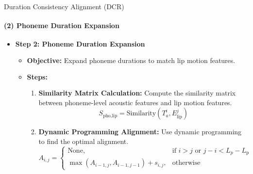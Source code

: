 \begin{frame}{Duration Consistency Alignment (DCR)}
\framesubtitle{(2) Phoneme Duration Expansion}
\begin{itemize}
    \item \textbf{Step 2: Phoneme Duration Expansion}
    \begin{itemize}
    \item \textbf{Objective:} Expand phoneme durations to match lip motion features.
    \item \textbf{Steps:}
    \begin{enumerate}
        \item \textbf{Similarity Matrix Calculation:} Compute the similarity matrix between phoneme-level acoustic features and lip motion features.
        \begin{equation}
            S_{\text{pho,lip}} = \text{Similarity}(T_a^i, E_{\text{lip}}^j)
        \end{equation}
        \item \textbf{Dynamic Programming Alignment:} Use dynamic programming to find the optimal alignment.
        \begin{equation}
            A_{i,j} = 
            \begin{cases} 
                \text{None}, & \text{if } i > j \text{ or } j - i < L_p - L_{\text{p}} \\
                \max(A_{i-1,j}, A_{i-1,j-1}) + s_{i,j}, & \text{otherwise}
            \end{cases}
        \end{equation}
    \end{enumerate}
\end{itemize}
\end{itemize}
\end{frame}


